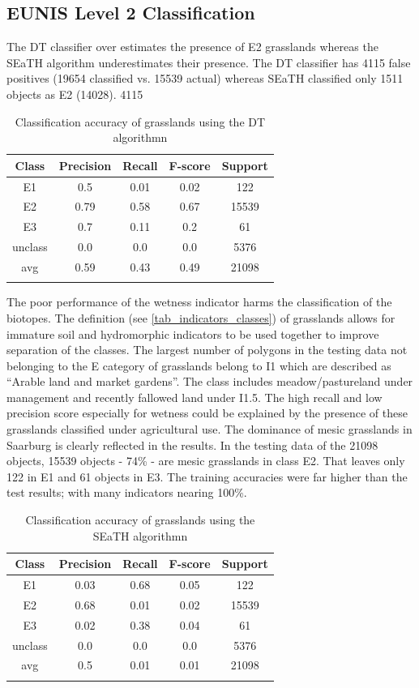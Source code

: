 \documentclass[authoryear, review,12pt,number]{elsarticle}
\begin{document}
\subsection{EUNIS Level 2 Classification}
\label{level2_classification}
The DT classifier over estimates the presence of E2 grasslands whereas
the SEaTH algorithm underestimates their presence. The DT classifier has 4115
false positives (19654 classified vs. 15539 actual) whereas SEaTH classified
only 1511 objects as E2 (14028). 
4115 
\begin{table}
\begin{tabular}{c c c c c}
Class & Precision & Recall & F-score & Support\\
\hline
E1 & 0.5 & 0.01 & 0.02 & 122\\
E2 & 0.79 & 0.58 & 0.67 & 15539\\
E3 & 0.7 & 0.11 & 0.2 & 61\\
unclass & 0.0 & 0.0 & 0.0 & 5376\\
avg & 0.59 & 0.43 & 0.49 & 21098\\
\label{fig_dt_lvl2_classification}
\end{tabular}
\caption{Classification accuracy of grasslands using the DT algorithmn}
\end{table}

The poor performance of the wetness indicator harms the classification of the
biotopes. The definition (see \ref{tab_indicators_classes}) of grasslands allows
for immature soil and hydromorphic indicators to be used together to improve
separation of the classes.
The largest number of polygons in the testing data not belonging to the E
category of grasslands belong to I1 which are described as ``Arable land and
market gardens''. The class includes meadow/pastureland under management and
recently fallowed land under I1.5. The high recall and low precision score
especially for wetness could be explained by the presence of these grasslands
classified under agricultural use.
The dominance of mesic grasslands in Saarburg is clearly reflected in
the results. In the testing data of the 21098 objects, 15539 objects - 74\% - are mesic grasslands
in class E2. That leaves only 122 in E1 and 61 objects in E3. The training
accuracies were far higher than the test results; with many indicators nearing
100\%.  



\begin{table}
\begin{tabular}{c c c c c}
Class & Precision & Recall & F-score & Support\\
\hline
E1 & 0.03 & 0.68 & 0.05 & 122\\
E2 & 0.68 & 0.01 & 0.02 & 15539\\
E3 & 0.02 & 0.38 & 0.04 & 61\\
unclass & 0.0 & 0.0 & 0.0 & 5376\\
avg & 0.5 & 0.01 & 0.01 & 21098\\
\label{fig_seath_lvl2_classification}
\end{tabular}
\caption{Classification accuracy of grasslands using the SEaTH algorithmn}
\end{table}
\end{document}
